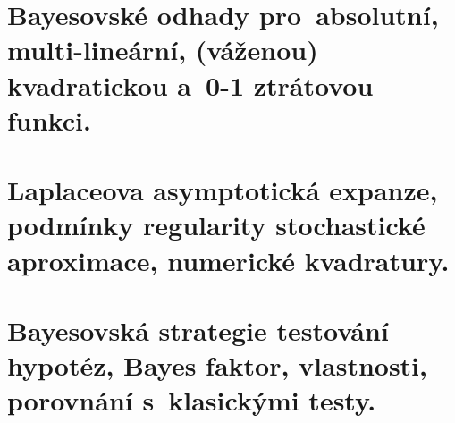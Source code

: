 \chapter{Bayesovské odhady pro~absolutní, multi-lineární, (váženou) kvadratickou a~0-1 ztrátovou funkci.}




\chapter{Laplaceova asymptotická expanze, podmínky regularity stochastické aproximace, numerické kvadratury.}




\chapter{Bayesovská strategie testování hypotéz, Bayes faktor, vlastnosti, porovnání s~klasickými testy.}


